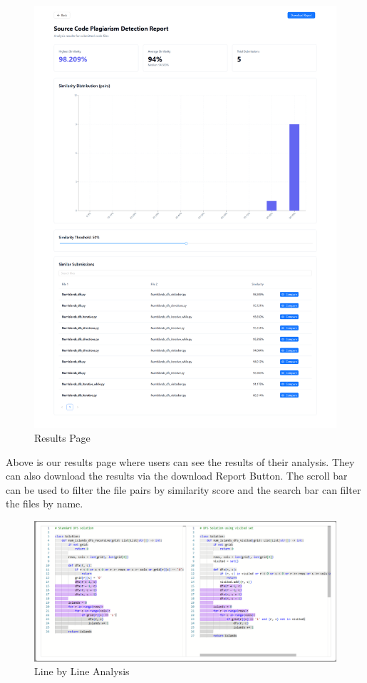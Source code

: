 \documentclass{article}
\begin{document}
\begin{figure}[H]
    \centering
    \includegraphics[height=\dimexpr\textheight-1cm\relax]{Results.png}
    \caption{Results Page}
    \label{fig:Results}
  \end{figure}

Above is our results page where users can see the results of their analysis. They can also download the results via the download Report Button.
The scroll bar can be used to filter the file pairs by similarity score and the search bar can filter the files by name.

\begin{figure}[H]
    \centering
    \includegraphics[width=\textwidth]{LineByLine.png}
    \caption{Line by Line Analysis}
    \label{fig:Line by Line}
  \end{figure}
\end{document}

